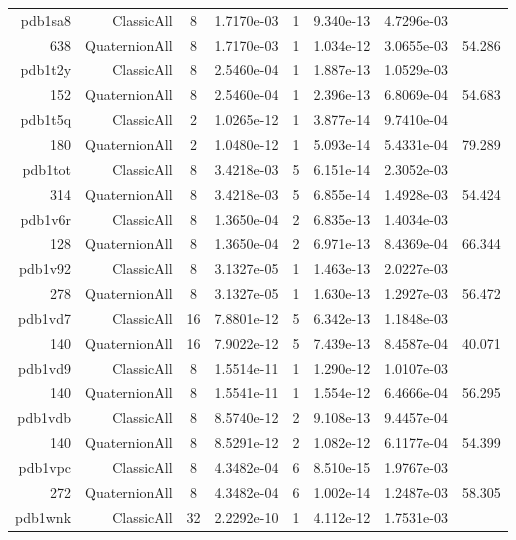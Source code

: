 \begin{xltabular}{\textwidth}{r|rcS[table-format=1.4e+2]cS[table-format=1.3e+2]S[table-format=1.4e+2]S[table-format=-1.3]}
pdb1sa8 & ClassicAll & 8 & 1.7170e-03 & 1 & 9.340e-13 & 4.7296e-03 & \\
638 & QuaternionAll & 8 & 1.7170e-03 & 1 & 1.034e-12 & 3.0655e-03 & 54.286\\  \addlinespace
pdb1t2y & ClassicAll & 8 & 2.5460e-04 & 1 & 1.887e-13 & 1.0529e-03 & \\
152 & QuaternionAll & 8 & 2.5460e-04 & 1 & 2.396e-13 & 6.8069e-04 & 54.683\\  \addlinespace
pdb1t5q & ClassicAll & 2 & 1.0265e-12 & 1 & 3.877e-14 & 9.7410e-04 & \\
180 & QuaternionAll & 2 & 1.0480e-12 & 1 & 5.093e-14 & 5.4331e-04 & 79.289\\  \addlinespace
pdb1tot & ClassicAll & 8 & 3.4218e-03 & 5 & 6.151e-14 & 2.3052e-03 & \\
314 & QuaternionAll & 8 & 3.4218e-03 & 5 & 6.855e-14 & 1.4928e-03 & 54.424\\  \addlinespace
pdb1v6r & ClassicAll & 8 & 1.3650e-04 & 2 & 6.835e-13 & 1.4034e-03 & \\
128 & QuaternionAll & 8 & 1.3650e-04 & 2 & 6.971e-13 & 8.4369e-04 & 66.344\\  \addlinespace
pdb1v92 & ClassicAll & 8 & 3.1327e-05 & 1 & 1.463e-13 & 2.0227e-03 & \\
278 & QuaternionAll & 8 & 3.1327e-05 & 1 & 1.630e-13 & 1.2927e-03 & 56.472\\  \addlinespace
pdb1vd7 & ClassicAll & 16 & 7.8801e-12 & 5 & 6.342e-13 & 1.1848e-03 & \\
140 & QuaternionAll & 16 & 7.9022e-12 & 5 & 7.439e-13 & 8.4587e-04 & 40.071\\  \addlinespace
pdb1vd9 & ClassicAll & 8 & 1.5514e-11 & 1 & 1.290e-12 & 1.0107e-03 & \\
140 & QuaternionAll & 8 & 1.5541e-11 & 1 & 1.554e-12 & 6.4666e-04 & 56.295\\  \addlinespace
pdb1vdb & ClassicAll & 8 & 8.5740e-12 & 2 & 9.108e-13 & 9.4457e-04 & \\
140 & QuaternionAll & 8 & 8.5291e-12 & 2 & 1.082e-12 & 6.1177e-04 & 54.399\\  \addlinespace
pdb1vpc & ClassicAll & 8 & 4.3482e-04 & 6 & 8.510e-15 & 1.9767e-03 & \\
272 & QuaternionAll & 8 & 4.3482e-04 & 6 & 1.002e-14 & 1.2487e-03 & 58.305\\  \addlinespace
pdb1wnk & ClassicAll & 32 & 2.2292e-10 & 1 & 4.112e-12 & 1.7531e-03 & \\

\end{xltabular}
